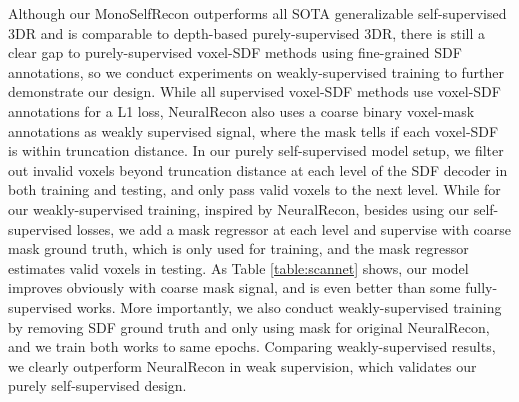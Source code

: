 Although our MonoSelfRecon outperforms all SOTA generalizable self-supervised 3DR and is comparable to depth-based purely-supervised 3DR, there is still a clear gap to purely-supervised voxel-SDF methods using fine-grained SDF annotations, so we conduct experiments on weakly-supervised training to further demonstrate our design. While all supervised voxel-SDF methods \cite{atlas,neucon,vortx} use voxel-SDF annotations for a L1 loss, NeuralRecon also uses a coarse binary voxel-mask annotations as weakly supervised signal, where the mask tells if each voxel-SDF is within truncation distance. In our purely self-supervised model setup, we filter out invalid voxels beyond truncation distance at each level of the SDF decoder in both training and testing, and only pass valid voxels to the next level. While for our weakly-supervised training, inspired by NeuralRecon, besides using our self-supervised losses, we add a mask regressor at each level and supervise with coarse mask ground truth, which is only used for training, and the mask regressor estimates valid voxels in testing. As Table \ref{table:scannet} shows, our model improves obviously with coarse mask signal, and is even better than some fully-supervised works. More importantly, we also conduct weakly-supervised training by removing SDF ground truth and only using mask for original NeuralRecon, and we train both works to same epochs. Comparing weakly-supervised results, we clearly outperform NeuralRecon in weak supervision, which validates our purely self-supervised design.

